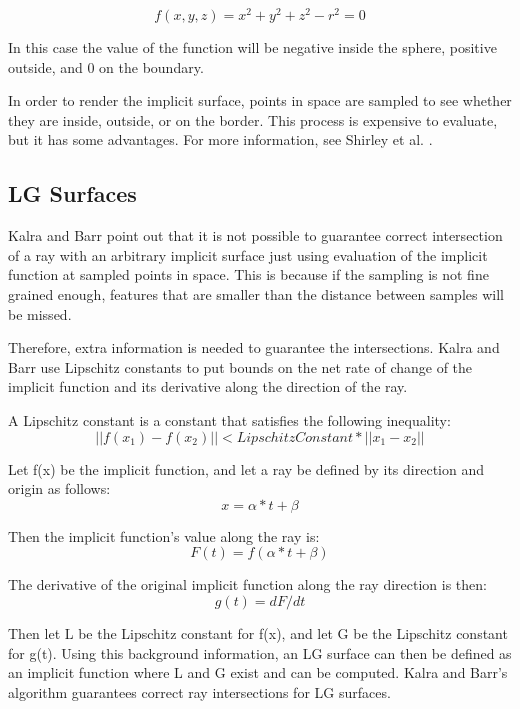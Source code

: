 \documentclass[conference]{acmsiggraph}
\begin{document}
\begin{equation}
f(x, y, z) = x^2 + y^2 + z^2 - r^2 = 0
\end{equation}

In this case the value of the function will be negative inside the 
sphere, positive outside, and 0 on the boundary.

In order to render the implicit surface, points in space are sampled
to see whether they are inside, outside, or on the border.  This process
is expensive to evaluate, but it has some advantages.  For more information,
see Shirley et al. \cite{Shirley}.

\subsection{LG Surfaces}

Kalra and Barr \cite{KalraBarr1989} point out that it is not possible to
guarantee correct intersection of a ray with an arbitrary implicit surface
just using evaluation of the implicit function at sampled points in space.
This is because if the sampling is not fine grained enough, features that
are smaller than the distance between samples will be missed.

Therefore, extra information is needed to guarantee the intersections.
Kalra and Barr use Lipschitz constants to put bounds
on the net rate of change of the implicit function and its derivative along
the direction of the ray.

A Lipschitz constant is a constant that satisfies the following inequality:
\begin{equation}
||f(x_1) - f(x_2)|| < LipschitzConstant * ||x_1 - x_2||
\end{equation}

Let f(x) be the implicit function, and let a ray be defined by its direction 
and origin as follows:
\begin{equation}
x = \alpha * t + \beta
\end{equation}

Then the implicit function's value along the ray is:
\begin{equation}
F(t) = f(\alpha * t + \beta)
\end{equation}

The derivative of the original implicit function along the ray direction is 
then:
\begin{equation}
g(t) = dF/dt
\end{equation}

Then let L be the Lipschitz constant for f(x), and let G be the Lipschitz
constant for g(t).  Using this background information, an LG surface can
then be defined as an implicit function where L and G exist and can be
computed.  Kalra and Barr's algorithm guarantees correct ray intersections
for LG surfaces.
\end{document}
